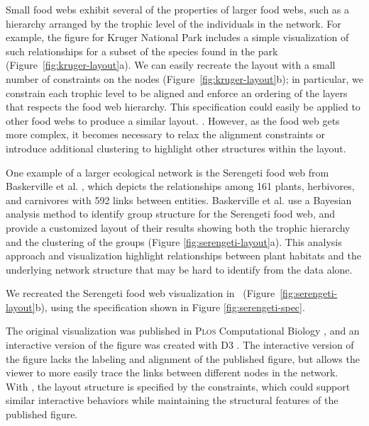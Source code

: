 Small food webs exhibit several of the properties of larger food webs, such
as a hierarchy arranged by the trophic level of the individuals in the
network. For example, the figure for Kruger National Park includes a simple visualization
of such relationships for a subset of the species found in the park
(Figure~\ref{fig:kruger-layout}a). We can easily recreate the layout with a
small number of constraints on the nodes (Figure~\ref{fig:kruger-layout}b);
in particular, we constrain each trophic level to be aligned and enforce an
ordering of the layers that respects the food web hierarchy. This
\projectname specification could easily be applied to other food webs to
produce a similar layout. . However, as the food
web gets more complex, it becomes necessary to relax the alignment
constraints or introduce additional clustering to highlight other
structures within the layout.

One example of a larger ecological network is the Serengeti food web from
Baskerville et al. \cite{baskerville2011spatial}, which depicts the
relationships among 161 plants, herbivores, and carnivores with 592 links
between entities. Baskerville et al. use a Bayesian analysis method to
identify group structure for the Serengeti food web, and provide a
customized layout of their results showing both the trophic hierarchy and
the clustering of the groups (Figure \ref{fig:serengeti-layout}a). This
analysis approach and visualization highlight relationships between plant
habitats and the underlying network structure that may be hard to identify
from the data alone.

We recreated the Serengeti food web visualization in
\projectname~(Figure~\ref{fig:serengeti-layout}b), using the specification
shown in Figure \ref{fig:serengeti-spec}.  

The original visualization was published in \textsc{Plos} Computational
Biology \cite{baskerville2011spatial}, and an interactive version of the
figure was created with D3 \cite{baskerville2011interactive}. The
interactive version of the figure lacks the labeling and alignment of the
published figure, but allows the viewer to more easily trace the links
between different nodes in the network. With \projectname, the layout
structure is specified by the constraints, which could support similar
interactive behaviors while maintaining the structural features of the
published figure.

